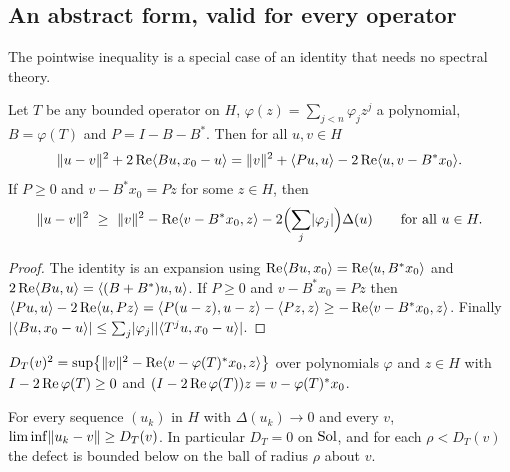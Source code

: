 \subsection{An abstract form, valid for every operator}\label{ssec:abstract}

The pointwise inequality is a special case of an identity that needs no spectral theory.

\begin{theorem}\label{thm:abstract-rigidity}
\stproved{} 
Let $T$ be any bounded operator on $H$, $\varphi(z)=\sum_{j<n}\varphi_jz^j$ a polynomial,
$B=\varphi(T)$ and $P=I-B-B^*$. Then for all $u,v\in H$
\[
\lVert u-v\rVert^2+2\operatorname{Re}\langle Bu,x_0-u\rangle=\lVert v\rVert^2+\langle Pu,u\rangle-2\operatorname{Re}\langle u,v-B^*x_0\rangle.
\]
If $P\ge0$ and $v-B^*x_0=Pz$ for some $z\in H$, then
\[
\lVert u-v\rVert^2\ \ge\ \lVert v\rVert^2-\operatorname{Re}\langle v-B^*x_0,z\rangle-2\Bigl(\sum_j\lvert \varphi_j\rvert\Bigr)\Delta(u)
\qquad\text{for all }u\in H .
\]
\end{theorem}
\begin{proof}
The identity is an expansion using $\operatorname{Re}\langle Bu,x_0\rangle=\operatorname{Re}\langle u,B^*x_0\rangle$ and
$2\operatorname{Re}\langle Bu,u\rangle=\langle (B+B^*)u,u\rangle$. If $P\ge0$ and $v-B^*x_0=Pz$ then
$\langle Pu,u\rangle-2\operatorname{Re}\langle u,Pz\rangle=\langle P(u-z),u-z\rangle-\langle Pz,z\rangle\ge-\operatorname{Re}\langle v-B^*x_0,z\rangle$. Finally
$\lvert \langle Bu,x_0-u\rangle\rvert\le\sum_j\lvert \varphi_j\rvert\lvert \langle T^ju,x_0-u\rangle\rvert$.
\end{proof}

\begin{definition}
$D_T(v)^2=\sup\bigl\{\lVert v\rVert^2-\operatorname{Re}\langle v-\varphi(T)^*x_0,z\rangle\bigr\}$ over polynomials
$\varphi$ and $z\in H$ with $I-2\operatorname{Re}\varphi(T)\ge0$ and $(I-2\operatorname{Re}\varphi(T))z=v-\varphi(T)^*x_0$.
\end{definition}

\begin{corollary}\label{cor:DT}\stproved{}
For every sequence $(u_k)$ in $H$ with $\Delta(u_k)\to0$ and every $v$,
$\liminf\lVert u_k-v\rVert\ge D_T(v)$. In particular $D_T=0$ on $\operatorname{Sol}$, and for each $\rho<D_T(v)$
the defect is bounded below on the ball of radius $\rho$ about $v$.
\end{corollary}


